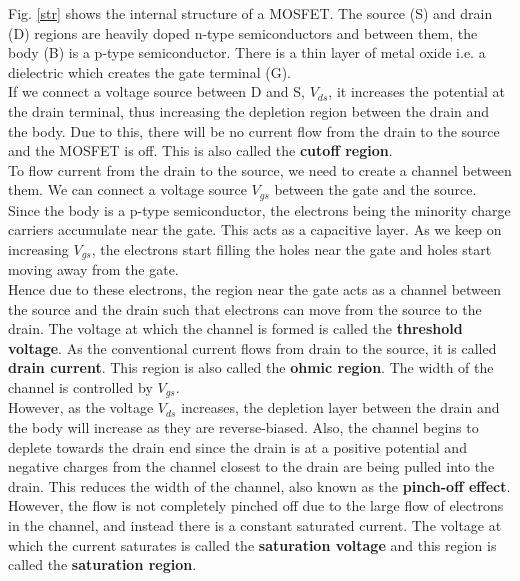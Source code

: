 Fig. \ref{str} shows the internal structure of a MOSFET. The source (S) and drain (D) regions are heavily doped n-type semiconductors and between them, the body (B) is a p-type semiconductor. There is a thin layer of metal oxide i.e. a dielectric which creates the gate terminal (G).\\

If we connect a voltage source between D and S, $V_{ds}$, it increases the potential at the drain terminal, thus increasing the depletion region between the drain and the body. Due to this, there will be no current flow from the drain to the source and the MOSFET is off. This is also called the \textbf{cutoff region}.\\

To flow current from the drain to the source, we need to create a channel between them. We can connect a voltage source $V_{gs}$ between the gate and the source. Since the body is a p-type semiconductor, the electrons being the minority charge carriers accumulate near the gate. This acts as a capacitive layer. As we keep on increasing $V_{gs}$, the electrons start filling the holes near the gate and holes start moving away from the gate.\\

Hence due to these electrons, the region near the gate acts as a channel between the source and the drain such that electrons can move from the source to the drain. The voltage at which the channel is formed is called the \textbf{threshold voltage}. As the conventional current flows from drain to the source, it is called \textbf{drain current}. This region is also called the \textbf{ohmic region}. The width of the channel is controlled by $V_{gs}$.\\

However, as the voltage $V_{ds}$ increases, the depletion layer between the drain and the body will increase as they are reverse-biased. Also, the channel begins to deplete towards the drain end since the drain is at a positive potential and negative charges from the channel closest to the drain are being pulled into the drain. This reduces the width of the channel, also known as the \textbf{pinch-off effect}.\\ 

However, the flow is not completely pinched off due to the large flow of electrons in the channel, and instead there is a constant saturated current. The voltage at which the current saturates is called the \textbf{saturation voltage} and this region is called the \textbf{saturation region}.

